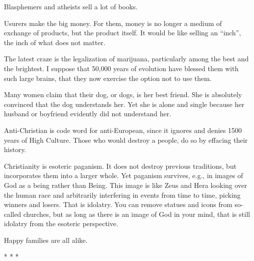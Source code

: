 Blasphemers and atheists sell a lot of books.

Usurers make the big money. For them, money is no longer a medium of exchange of products, but the product itself. It would be like selling an ``inch'', the inch of what does not matter.

The latest craze is the legalization of marijuana, particularly among the best and the brightest. I suppose that 50,000 years of evolution have blessed them with such large brains, that they now exercise the option not to use them.

Many women claim that their dog, or dogs, is her best friend. She is absolutely convinced that the dog understands her. Yet she is alone and single because her husband or boyfriend evidently did not understand her.

Anti-Christian is code word for anti-European, since it ignores and denies 1500 years of High Culture. Those who would destroy a people, do so by effacing their history.

Christianity is esoteric paganism. It does not destroy previous traditions, but incorporates them into a larger whole. Yet paganism survives, e.g., in images of God as a being rather than Being. This image is like Zeus and Hera looking over the human race and arbitrarily interfering in events from time to time, picking winners and losers. That is idolatry. You can remove statues and icons from so-called churches, but as long as there is an image of God in your mind, that is still idolatry from the esoteric perspective.

\begin{quotex}
Happy families are all alike.
\end{quotex}




\begin{center}* * *\end{center}

